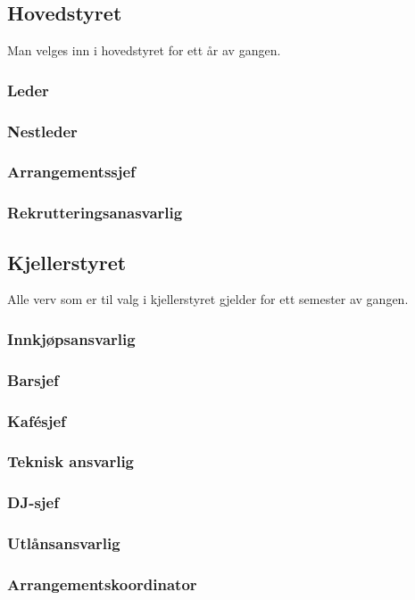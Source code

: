\documentclass[10pt,norsk,a4paper]{article}
\begin{document}
\begin{minipage}[t]{0.49\textwidth}
\subsection{Hovedstyret} %
Man velges inn i hovedstyret for ett år av gangen.

\subsubsection{Leder}
\subsubsection{Nestleder}
\subsubsection{Arrangementssjef}
\subsubsection{Rekrutteringsanasvarlig}

\end{minipage}
\begin{minipage}[t]{0.49\textwidth}
\subsection{Kjellerstyret} %
Alle verv som er til valg i kjellerstyret gjelder for ett semester av gangen.

\subsubsection{Innkjøpsansvarlig}
\subsubsection{Barsjef}
\subsubsection{Kafésjef}
\subsubsection{Teknisk ansvarlig}
\subsubsection{DJ-sjef}
\subsubsection{Utlånsansvarlig}
\subsubsection{Arrangementskoordinator}

\end{minipage}
\end{document}
